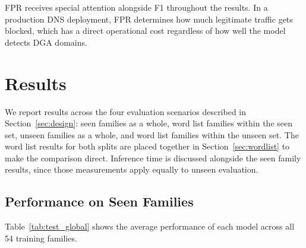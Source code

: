 \documentclass[conference]{IEEEtran}
\begin{document}
FPR receives special attention alongside F1 throughout the results. In a production DNS deployment, FPR determines how much legitimate traffic gets blocked, which has a direct operational cost regardless of how well the model detects DGA domains.

\section{Results}
\label{sec:results}

We report results across the four evaluation scenarios described in Section~\ref{sec:design}: seen families as a whole, word list families within the seen set, unseen families as a whole, and word list families within the unseen set. The word list results for both splits are placed together in Section~\ref{sec:wordlist} to make the comparison direct. Inference time is discussed alongside the seen family results, since those measurements apply equally to unseen evaluation.

\subsection{Performance on Seen Families}

Table~\ref{tab:test_global} shows the average performance of each model across all 54 training families.

\begin{table}[!t]
\caption{Average performance on the 54 training families (30 runs per family, 50 DGA + 50 legitimate per run). Models sorted by F1. Best value per metric in \textbf{bold}.}
\label{tab:test_global}
\centering
\renewcommand{\arraystretch}{1.1}
\end{table}
\end{document}
